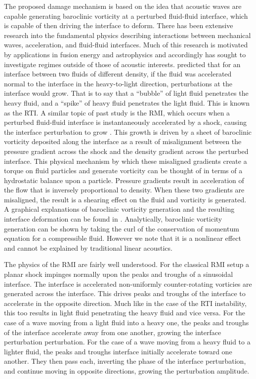 \documentclass{article}
\begin{document}
The proposed damage mechanism is based on the idea that acoustic waves
are capable generating baroclinic vorticity at a perturbed fluid-fluid
interface, which is capable of then driving the interface to
deform. There has been extensive research into the fundamental physics
describing interactions between mechanical waves, acceleration, and
fluid-fluid interfaces. Much of this research is motivated by
applications in fusion energy and astrophysics and accordingly has
sought to investigate regimes outside of those of acoustic
interests. \cite{Taylor1950} predicted that for an interface between
two fluids of different density, if the fluid was accelerated normal
to the interface in the heavy-to-light direction, perturbations at the
interface would grow. That is to say that a ``bubble'' of light fluid
penetrates the heavy fluid, and a ``spike'' of heavy fluid penetrates
the light fluid. This is known as the \ac{RTI}. A similar topic of
past study is the \ac{RMI}, which occurs when a perturbed fluid-fluid
interface is instantaneously accelerated by a shock, causing the
interface perturbation to grow \citep{Brouillette2002,Drake2006}. This
growth is driven by a sheet of baroclinic vorticity deposited along
the interface as a result of misalignment between the pressure
gradient across the shock and the density gradient across the
perturbed interface. This physical mechanism by which these misaligned
gradients create a torque on fluid particles and generate vorticity
can be thought of in terms of a hydrostatic balance upon a
particle. Pressure gradients result in acceleration of the flow that
is inversely proportional to density. When these two gradients are
misaligned, the result is a shearing effect on the fluid and vorticity
is generated. A graphical explanations of baroclinic vorticity
generation and the resulting interface deformation can be found in
\citep{Heifetz2015}. Analytically, baroclinic vorticity generation can
be shown by taking the curl of the conservation of momentum equation
for a compressible fluid. However we note that it is a nonlinear
effect and cannot be explained by traditional linear acoustics.

The physics of the \ac{RMI} are fairly well understood. For the
classical \ac{RMI} setup a planar shock impinges normally upon the
peaks and troughs of a sinusoidal interface. The interface is
accelerated non-uniformly counter-rotating vorticies are generated
across the interface. This drives peaks and troughs of the interface
to accelerate in the opposite direction. Much like in the case of the
\ac{RTI} instability, this too results in light fluid penetrating the
heavy fluid and vice versa. For the case of a wave moving from a light
fluid into a heavy one, the peaks and troughs of the interface
accelerate away from one another, growing the interface perturbation
perturbation. For the case of a wave moving from a heavy fluid to a
lighter fluid, the peaks and troughs interface initially accelerate
toward one another. They then pass each, inverting the phase of the
interface perturbation, and continue moving in opposite directions,
growing the perturbation amplitude.
\end{document}
